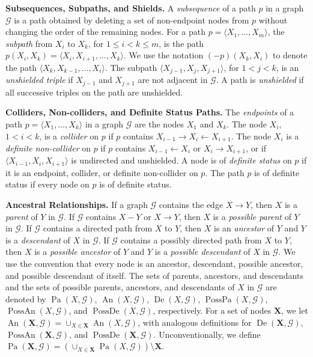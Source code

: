 \documentclass[11pt]{article}
\DeclareMathOperator{\An}{An}
\DeclareMathOperator{\Pa}{Pa}
\DeclareMathOperator{\De}{De}
\DeclareMathOperator{\PossDe}{PossDe}
\DeclareMathOperator{\PossPa}{PossPa}
\DeclareMathOperator{\PossAn}{PossAn}
\newcommand{\mb}[1]{\mathbf{#1}}
\newcommand{\g}[1][G]{\mathcal{#1}}
\begin{document}
\textbf{Subsequences, Subpaths, and Shields.}
A \textit{subsequence} of a path $p$ in a graph $\g$ is a path obtained by deleting a set of non-endpoint nodes from $p$ without changing the order of the remaining nodes. For a path $p = \langle X_1, \dots, X_m \rangle$, the \textit{subpath} from $X_i$ to $X_k$, for $1 \le i < k \le m$, is the path $p(X_i,X_k) = \langle X_i,X_{i+1}, \dots, X_{k}\rangle$. We use the notation $(-p)(X_k,X_i)$ to denote the path $\langle X_{k}, X_{k-1}, \dots, X_i \rangle$. The subpath $\langle X_{j-1}, X_j, X_{j+1} \rangle$, for $1<j<k$, is an \emph{unshielded triple} if $X_{j-1}$ and $X_{j+1}$ are not adjacent in $\g$. A path is \textit{unshielded} if all successive triples on the path are unshielded.

\textbf{Colliders, Non-colliders, and Definite Status Paths.}
The \textit{endpoints} of a path $p = \langle X_1, \dots, X_k \rangle$ in a graph $\g$ are the nodes $X_1$ and $X_k$. The node $X_i$, $1 < i < k$, is a \textit{collider} on $p$ if $p$ contains $X_{i-1} \to X_i \gets X_{i+1}$. The node $X_i$ is a \textit{definite non-collider} on $p$ if $p$ contains $X_{i-1} \gets X_i$ or $X_i \to X_{i+1}$, or if $\langle X_{i-1}, X_i, X_{i+1} \rangle$ is undirected and unshielded. A node is of \textit{definite status} on $p$ if it is an endpoint, collider, or definite non-collider on $p$. The path $p$ is of definite status if every node on $p$ is of definite status.

\textbf{Ancestral Relationships.}
If a graph $\g$ contains the edge $X \to Y$, then $X$ is a \textit{parent} of $Y$ in $\g$. If $\g$ contains $X - Y$ or $X \to Y$, then $X$ is a \textit{possible parent} of $Y$ in $\g$. If $\g$ contains a directed path from $X$ to $Y$, then $X$ is an \textit{ancestor} of $Y$ and $Y$ is a \textit{descendant} of $X$ in $\g$. If $\g$ contains a possibly directed path from $X$ to $Y$, then $X$ is a \textit{possible ancestor} of $Y$ and $Y$ is a \textit{possible descendant} of $X$ in $\g$. We use the convention that every node is an ancestor, descendant, possible ancestor, and possible descendant of itself. The sets of parents, ancestors, and descendants and the sets of possible parents, ancestors, and descendants of $X$ in $\g$ are denoted by $\Pa(X,\g)$, $\An(X,\g)$, $\De(X,\g)$, $\PossPa(X,\g)$, $\PossAn(X,\g)$, and $\PossDe(X,\g)$, respectively. For a set of nodes $\mb{X}$, we let $\An(\mb{X},\g) = \cup_{X \in \mb{X}} \An(X,\g)$, with analogous definitions for $\De(\mb{X},\g)$, $\PossAn(\mb{X},\g)$, and $\PossDe(\mb{X},\g)$. Unconventionally, we define $\Pa(\mb{X},\g) =(\cup_{X \in \mb{X}} \Pa(X,\g)) \setminus \mb{X}$.
\end{document}
